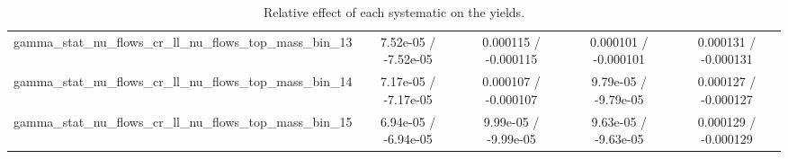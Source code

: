 \documentclass[10pt]{article}
\begin{document}
\begin{table}[htbp]
\begin{center}
\begin{tabular}{|c|c|c|c|c|}
  gamma_stat_nu_flows_cr_ll_nu_flows_top_mass_bin_13 & 7.52e-05 / -7.52e-05 & 0.000115 / -0.000115 & 0.000101 / -0.000101 & 0.000131 / -0.000131 \\ 
  gamma_stat_nu_flows_cr_ll_nu_flows_top_mass_bin_14 & 7.17e-05 / -7.17e-05 & 0.000107 / -0.000107 & 9.79e-05 / -9.79e-05 & 0.000127 / -0.000127 \\ 
  gamma_stat_nu_flows_cr_ll_nu_flows_top_mass_bin_15 & 6.94e-05 / -6.94e-05 & 9.99e-05 / -9.99e-05 & 9.63e-05 / -9.63e-05 & 0.000129 / -0.000129 \\ 
\hline 
\end{tabular} 
\caption{Relative effect of each systematic on the yields.} 
\end{center} 
\end{table} 
\end{document}
